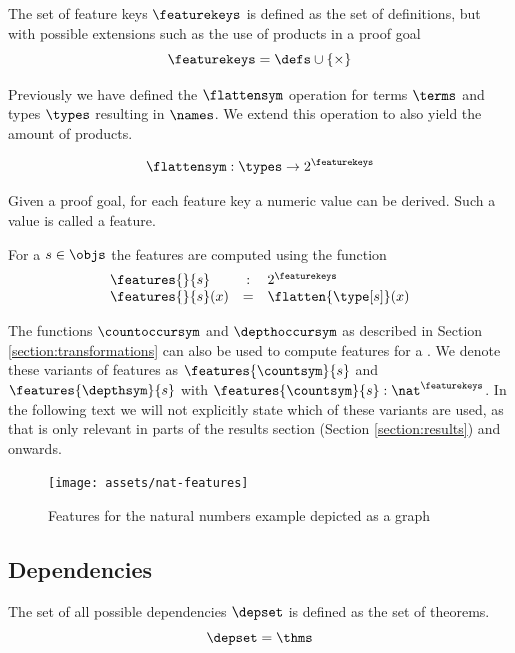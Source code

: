 \begin{definition}\label{def:featurekeys}
  The set of feature keys $\featurekeys$ is defined as the set of definitions, but with possible extensions such as the use of products in a proof goal
  \[ \featurekeys = \defs \cup \{ \times \} \]
\end{definition}

Previously we have defined the $\flattensym$ operation for terms $\terms$ and types $\types$ resulting in $\names$.
We extend this operation to also yield the amount of products.

\[ \flattensym : \types \rightarrow 2^{\featurekeys} \]

Given a proof goal, for each feature key a numeric value can be derived.
Such a value is called a feature.

\begin{definition}\label{def:features}
  For a \coqobj $s \in \objs$ the features are computed using the function
  $$
  \begin{array}{lcl}
    \features{}{s} & : & 2^\featurekeys \\
    \features{}{s}(x) & = & \flatten{\type[s]}(x)
  \end{array}
  $$
\end{definition}

The functions $\countoccursym$ and $\depthoccursym$ as described in Section \ref{section:transformations} can also be used to compute features for a \coqobj.
We denote these variants of features as $\features{\countsym}{s}$ and $\features{\depthsym}{s}$ with $\features{\countsym}{s} : \nat^\featurekeys$.
In the following text we will not explicitly state which of these variants are used,
as that is only relevant in parts of the results section (Section \ref{section:results}) and onwards.

\begin{figure}[H]
	\centerline{\texttt{[image: assets/nat-features]}}
	\caption{Features for the natural numbers example depicted as a graph}
\end{figure}

\subsection{Dependencies}
\label{section:deps}

\begin{definition}\label{def:depset}
  The set of all possible dependencies $\depset$ is defined as the set of theorems.
  $$
  \depset = \thms
  $$
\end{definition}

